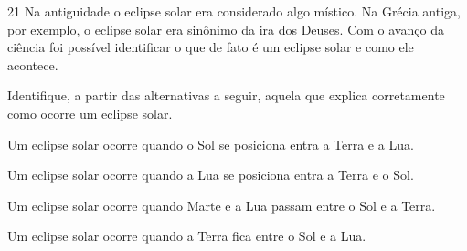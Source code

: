 \pagebreak
\num{21}
  Na antiguidade o eclipse solar era considerado algo místico. Na Grécia
  antiga, por exemplo, o eclipse solar era sinônimo da ira dos Deuses.
  Com o avanço da ciência foi possível identificar o que de fato é um
  eclipse solar e como ele acontece.


Identifique, a partir das alternativas a seguir, aquela que explica
corretamente como ocorre um eclipse solar.

\begin{escolha}
\item
  Um eclipse solar ocorre quando o Sol se posiciona entra a Terra e a Lua.
\item
  Um eclipse solar ocorre quando a Lua se posiciona entra a Terra e o Sol.
\item
  Um eclipse solar ocorre quando Marte e a Lua passam entre o Sol e a Terra.
\item
  Um eclipse solar ocorre quando a Terra fica entre o Sol e a Lua.
\end{escolha}

